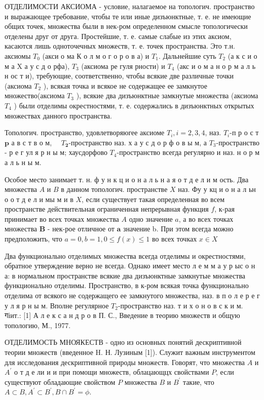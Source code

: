 \documentclass[10pt]{article}
\begin{document}
ОТДЕЛИМОСТИ АКСИОМА - условие, налагаемое на топологич. пространство и выражающее требование, чтобы те или иные дизъюнктные, т. е. не имеющие общих точек, множества были в нек-ром определенном смысле топологически отделены друг от друга. Простейшие, т. е. самые слабые из этих аксиом, касаются лишь одноточечных множеств, т. е. точек пространства. Это т.н. аксиомы $T_{0}$ (акси о ма К о л м о г о р о в а) и $T_{1}$. Дальнейшие суть $T_{2}$ (а к с и о м а $\mathrm{X}$ а у с д о рфа), $T_{3}$ (аксиома ре гуля рности) и $T_{4}$ (акс и о м а н о р м а л ь н ос т и), требующие, соответственно, чтобы всякие две различные точки (аксиома $T_{2}$ ), всякая точка и всякое не содержащее ее замкнутое множество(аксиома $T_{3}$ ), всякие два дизъюнктные замкнутые множества (аксиома $T_{4}$ ) были отделимы окрестностями, т. е. содержались в дизъюнктных открытых множествах данного пространства.



Топологич. пространство, удовлетворяюгее аксиоме $T_{i}, i=2,3,4$, наз. $T_{i}$-п р о с т $\mathbf{p}$ а в с т в о м, $\quad T_{\mathbf{2}}$-пространство наз. х а у с д о р ф о в ы м, а $T_{3}$-пространство - р е г ул я р н ы м; хаусдорфово $T_{4}$-пространство всегда регулярно и наз. н о р м а л ь н ы м.



Особое место занимает т. н. ф у н к ц и о н а л ь н а я о т д е л и м ость. Два множества $A$ и $B$ в данном топологич. пространстве $X$ наз. Фу у кц и о н а л ьн о о т д е л и мы м и в $X$, если существует такая определенная во всем пространстве действительная ограниченная непрерывная функция $f$, к-рая принимает во всех точках множества $A$ одно значение $a$, а во всех точках множества $\boldsymbol{B}$ - нек-рое отличное от $\boldsymbol{a}$ значение b. При этом всегда можно предположить, что $a=0, b=1,0 \leqslant f(x) \leqslant 1$ во всех точках $x \in X$



Два функционально отделимых множества всегда отделимы и окрестностями, обратное утверждение верно не всегда. Однако имеет место л е м м а у р ыс о н а: в нормальном пространстве всякие два дизъюнктные замкнутые множества функционально отделимы. Пространство, в к-ром всякая точка функционально отделима от всякого не содержащего ее замкнутого множества, наз. в п о л е р е г у л я р н ы м. Вполне регулярное $T_{2}$-пространство наз. т и х о н о в с к и м. गіит.: [1] А л е к с а н д р о в П. С., Введение в теорию множеств и общую топологию, М., 1977.



ОТДЕЛИМОСТЬ МНОЯКЕСТВ - одно из основных понятий дескриптивной теории множеств (введенное H. Н. Лузиным [1]). Служит важным инструментом для исследования дескриптивной природы множеств. Говорят, что множества $A$ и $A^{\prime}$ о т д е ли и и при помощи множеств, облацающцх свойствами $P$, если существуют обладающие свойством $P$ множества $B$ и $B^{\prime}$ такие, что $A \subset B, A^{\prime} \subset B^{\prime}, B \cap B^{\prime}=\phi$.
\end{document}
